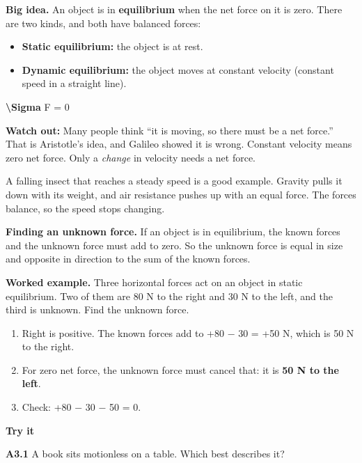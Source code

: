 \documentclass[
]{article}
\newenvironment{Shaded}{\begin{snugshade}}{\end{snugshade}}
\newcommand{\FunctionTok}[1]{\textcolor[rgb]{0.13,0.29,0.53}{\textbf{#1}}}
\newcommand{\NormalTok}[1]{#1}
\providecommand{\tightlist}{%
  \setlength{\itemsep}{0pt}\setlength{\parskip}{0pt}}
\begin{document}
\textbf{Big idea.} An object is in \textbf{equilibrium} when the net
force on it is zero. There are two kinds, and both have balanced forces:

\begin{itemize}
\tightlist
\item
  \textbf{Static equilibrium:} the object is at rest.
\item
  \textbf{Dynamic equilibrium:} the object moves at constant velocity
  (constant speed in a straight line).
\end{itemize}

\begin{Shaded}
\begin{Highlighting}[]
\FunctionTok{\textbackslash{}Sigma}\NormalTok{ F = 0}
\end{Highlighting}
\end{Shaded}

\textbf{Watch out:} Many people think ``it is moving, so there must be a
net force.'' That is Aristotle's idea, and Galileo showed it is wrong.
Constant velocity means zero net force. Only a \emph{change} in velocity
needs a net force.

A falling insect that reaches a steady speed is a good example. Gravity
pulls it down with its weight, and air resistance pushes up with an
equal force. The forces balance, so the speed stops changing.

\textbf{Finding an unknown force.} If an object is in equilibrium, the
known forces and the unknown force must add to zero. So the unknown
force is equal in size and opposite in direction to the sum of the known
forces.

\textbf{Worked example.} Three horizontal forces act on an object in
static equilibrium. Two of them are 80 N to the right and 30 N to the
left, and the third is unknown. Find the unknown force.

\begin{enumerate}
\def\labelenumi{\arabic{enumi}.}
\tightlist
\item
  Right is positive. The known forces add to +80 − 30 = +50 N, which is
  50 N to the right.
\item
  For zero net force, the unknown force must cancel that: it is
  \textbf{50 N to the left}.
\item
  Check: +80 − 30 − 50 = 0.
\end{enumerate}

\textbf{Try it}

\textbf{A3.1} A book sits motionless on a table. Which best describes
it?
\end{document}
